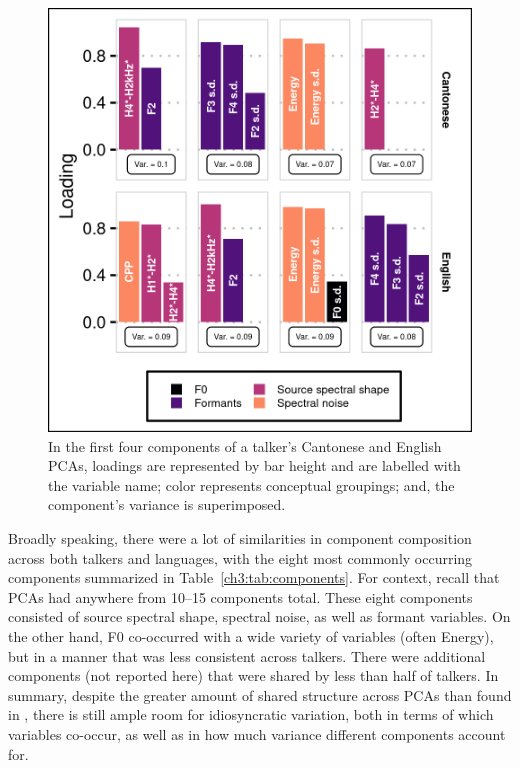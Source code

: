 \begin{figure}[htbp]
\begin{center}
\includegraphics[width=0.875\linewidth]{figures/3-VF32A_pretty.png} 
\caption{In the first four components of a talker's Cantonese and English PCAs, loadings are represented by bar height and are labelled with the variable name; color represents conceptual groupings; and, the component's variance is superimposed.}
\label{ch3:fig:VF32A}
\end{center}
\end{figure}

Broadly speaking, there were a lot of similarities in component composition across both talkers and languages, with the eight most commonly occurring components summarized in Table~\ref{ch3:tab:components}. For context, recall that PCAs had anywhere from 10--15 components total. These eight components consisted of source spectral shape, spectral noise, as well as formant variables. On the other hand, F0 co-occurred with a wide variety of variables (often Energy), but in a manner that was less consistent across talkers. There were additional components (not reported here) that were shared by less than half of talkers. In summary, despite the greater amount of shared structure across PCAs than found in \citet{lee_2019_acoustic}, there is still ample room for idiosyncratic variation, both in terms of which variables co-occur, as well as in how much variance different components account for. 

